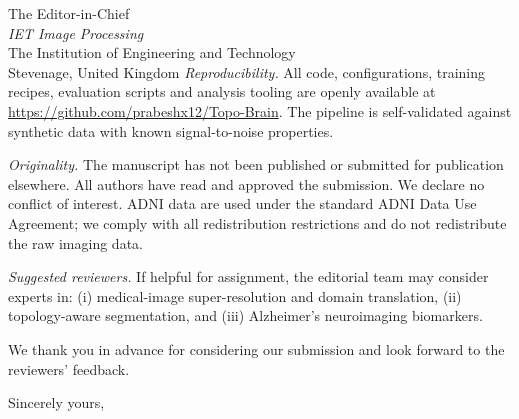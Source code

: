 \documentclass[11pt,a4paper]{letter}
\begin{document}
\begin{letter}{The Editor-in-Chief\\
\textit{IET Image Processing}\\
The Institution of Engineering and Technology\\
Stevenage, United Kingdom}
\textit{Reproducibility.} All code, configurations, training
recipes, evaluation scripts and analysis tooling are openly available
at \url{https://github.com/prabeshx12/Topo-Brain}. The pipeline is
self-validated against synthetic data with known signal-to-noise
properties.

\textit{Originality.} The manuscript has not been published or
submitted for publication elsewhere. All authors have read and
approved the submission. We declare no conflict of interest. ADNI
data are used under the standard ADNI Data Use Agreement; we comply
with all redistribution restrictions and do not redistribute the raw
imaging data.

\textit{Suggested reviewers.} If helpful for assignment, the editorial
team may consider experts in: (i) medical-image super-resolution and
domain translation, (ii) topology-aware segmentation, and
(iii) Alzheimer's neuroimaging biomarkers.

We thank you in advance for considering our submission and look
forward to the reviewers' feedback.

\closing{Sincerely yours,}

\end{letter}
\end{document}

